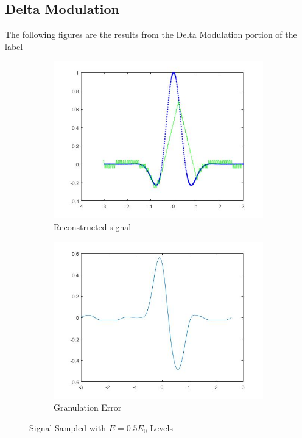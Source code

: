 \documentclass{article}
\begin{document}
\subsection{Delta Modulation}
The following figures are the results from the Delta Modulation portion of the label
\begin{figure}[H]
  \begin{center}
    \begin{subfigure}[b]{0.4\linewidth}
      \includegraphics[width = \linewidth]{Del_0_5.jpg}
      \caption{Reconstructed signal}
    \end{subfigure}
    \begin{subfigure}[b]{0.4\linewidth}
      \includegraphics[width = \linewidth]{Del_Error_0_5.jpg}
      \caption{Granulation Error}
    \end{subfigure}
    \caption{Signal Sampled with $E = 0.5 E_0$ Levels}
    \label{fig:figure3}
  \end{center}
\end{figure}
\end{document}

